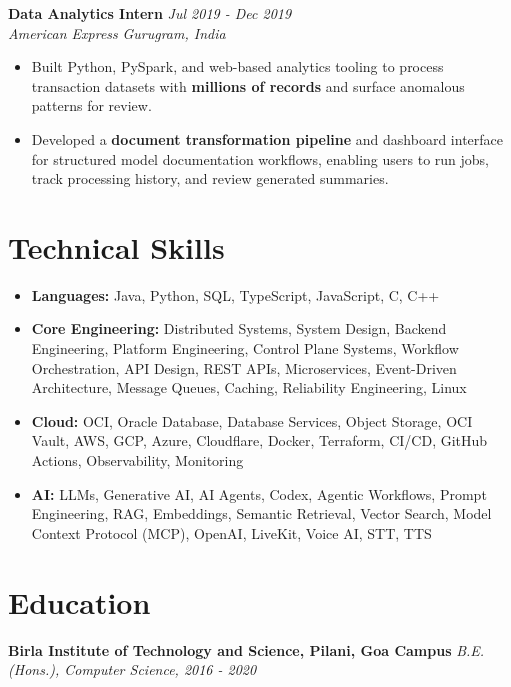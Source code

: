 \documentclass[10pt,letterpaper]{article}
\newcommand{\resumejob}[4]{%
  \textbf{#3} \hfill \textit{#4}\\
  \textit{#1} \hfill \textit{#2}\\[-0.9em]
}
\begin{document}
\vspace{0.35em}
\resumejob{American Express}{Gurugram, India}{Data Analytics Intern}{Jul 2019 - Dec 2019}
\begin{itemize}
  \item Built Python, PySpark, and web-based analytics tooling to process transaction datasets with \textbf{millions of records} and surface anomalous patterns for review.
  \item Developed a \textbf{document transformation pipeline} and dashboard interface for structured model documentation workflows, enabling users to run jobs, track processing history, and review generated summaries.
\end{itemize}

\section*{Technical Skills}
\begin{itemize}
  \item \textbf{Languages:} Java, Python, SQL, TypeScript, JavaScript, C, C++
  \item \textbf{Core Engineering:} Distributed Systems, System Design, Backend Engineering, Platform Engineering, Control Plane Systems, Workflow Orchestration, API Design, REST APIs, Microservices, Event-Driven Architecture, Message Queues, Caching, Reliability Engineering, Linux
  \item \textbf{Cloud:} OCI, Oracle Database, Database Services, Object Storage, OCI Vault, AWS, GCP, Azure, Cloudflare, Docker, Terraform, CI/CD, GitHub Actions, Observability, Monitoring
  \item \textbf{AI:} LLMs, Generative AI, AI Agents, Codex, Agentic Workflows, Prompt Engineering, RAG, Embeddings, Semantic Retrieval, Vector Search, Model Context Protocol (MCP), OpenAI, LiveKit, Voice AI, STT, TTS
\end{itemize}

\section*{Education}
\textbf{Birla Institute of Technology and Science, Pilani, Goa Campus} \hfill \textit{B.E. (Hons.), Computer Science, 2016 - 2020}
\end{document}
